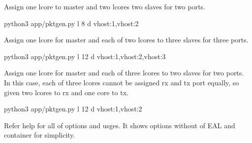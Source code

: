 \documentclass[a4paper,11pt,openany,oneside,english]{sphinxmanual}
\begin{document}

Assign one lcore to master and two lcores two slaves for two ports.

\begin{sphinxVerbatim}[commandchars=\\\{\},formatcom=\footnotesize]
 python3 app/pktgen.py \PYGZhy{}l \PYGZhy{}8 \PYGZhy{}d vhost:1,vhost:2
\end{sphinxVerbatim}


Assign one lcore for master and each of two lcores to
three slaves for three ports.

\begin{sphinxVerbatim}[commandchars=\\\{\},formatcom=\footnotesize]
 python3 app/pktgen.py \PYGZhy{}l \PYGZhy{}12 \PYGZhy{}d vhost:1,vhost:2,vhost:3
\end{sphinxVerbatim}


Assign one lcore for master and each of three lcores to
two slaves for two ports.
In this case, each of three lcores cannot be assigned rx and tx port
equally, so given two lcores to rx and one core to tx.

\begin{sphinxVerbatim}[commandchars=\\\{\},formatcom=\footnotesize]
 python3 app/pktgen.py \PYGZhy{}l \PYGZhy{}12 \PYGZhy{}d vhost:1,vhost:2
\end{sphinxVerbatim}

Refer help for all of options and usges.
It shows options without of EAL and container for simplicity.
\end{document}
